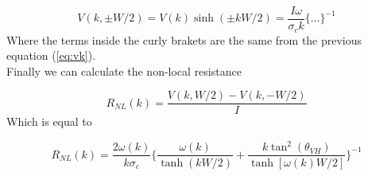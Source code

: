 \begin{equation}
    V(k,\pm W/2)=V(k)\sinh(\pm kW/2)=\frac{I\omega}{\sigma_c k}\bigg\{\dots\bigg\}^{-1}
\end{equation}
Where the terms inside the curly brakets are the same from the previous equation (\ref{eq:vk}).\\
Finally we can calculate the non-local resistance

\begin{equation}
    R_{NL}(k)=\frac{V(k,W/2)-V(k,-W/2)}I
\end{equation}
Which is equal to

\begin{equation}
    R_{NL}(k)=\frac{2\omega(k)}{k\sigma_c}
    \bigg\{
        \frac{\omega(k)}{\tanh(kW/2)} + \frac{k\tan^2(\theta_{VH})}{\tanh[\omega(k)W/2]}    
    \bigg\}^{-1}
\end{equation}



